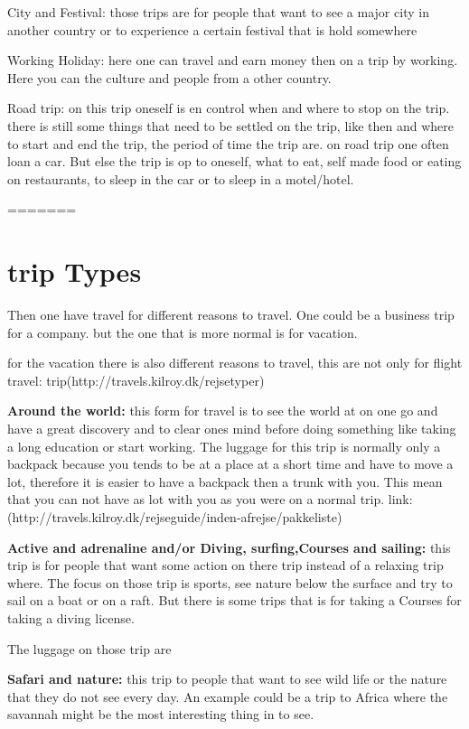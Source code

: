 City and Festival:
those trips are for people that want to see a major city in another country or to experience a certain festival that is hold somewhere 

Working Holiday:
here one can travel and earn money then on a trip by working. Here you can the culture and people from a other country. 

Road trip:
on this trip oneself is en control when and where to stop on the trip. there is still some things that need to be settled on the trip, like then and where to start and end the trip, the period of time the trip are. on road trip one often loan a car. But else the trip is op to oneself, what to eat, self made food or eating on restaurants, to sleep in the car or to sleep in a motel/hotel.

=======
\section{trip Types}
Then one have travel for different reasons to travel.
One could be a business trip for a company. but the one that is more normal is for vacation.

for the vacation there is also different reasons to travel, this are not only for flight travel:
trip(http://travels.kilroy.dk/rejsetyper)

\textbf{Around the world:}
this form for travel is to see the world at on one go and have a great discovery and to clear ones mind before doing something like taking a long education or start working.
The luggage for this trip is normally only a backpack because you tends to be at a place at a short time and have to move a lot, therefore it is easier to have a backpack then a trunk with you. This mean that you can not have as lot with you as you were on a normal trip.
link:(http://travels.kilroy.dk/rejseguide/inden-afrejse/pakkeliste)



\textbf{Active and adrenaline and/or Diving, surfing,Courses and sailing:}
this trip is for people that want some action on there trip instead of a relaxing trip where. The focus on those trip is sports, see nature below the surface and try to sail on a boat or on a raft. But there is some trips that is for taking a Courses for taking a diving license.

The luggage on those trip are 


\textbf{Safari and nature:}
this trip to people that want to see wild life or the nature that they do not see every day. An example could be a trip to Africa where the savannah might be the most interesting thing in to see.

